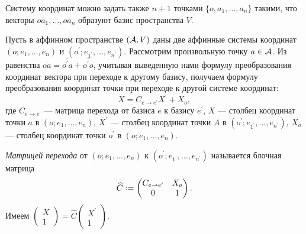 \begin{remark}
    Систему координат можно задать также $n + 1$ точками $\{o, a_1, \ldots, a_n\}$ такими, что векторы $\overline{oa_1}, \ldots, \overline{oa_n}$ образуют базис пространства $V$.
\end{remark}

Пусть в аффинном пространстве $(\mathcal{A}, V)$ даны две аффинные системы координат $(o; e_1, \ldots, e_n)$ и $(o^\prime; e_{1^\prime}, \ldots, e_{n^\prime})$. Рассмотрим произвольную точку $a \in \mathcal{A}$. Из равенства $\overline{oa} = \overline{o^\prime a} + \overline{o^\prime o}$, учитывая выведенную нами формулу преобразования координат вектора при переходе к другому базису, получаем формулу преобразования координат точки при переходе к другой системе координат:
\[
    X = C_{e \to e^\prime}X^\prime + X_o,
\]
где $C_{e \to e^\prime}$ --- матрица перехода от базиса $e$ к базису $e^\prime$, $X$ --- столбец координат точки $a$ в $(o; e_1, \ldots, e_n)$, $X^\prime$ --- столбец координат точки $A$ в $(o^\prime; e_{1^\prime}, \ldots, e_{n^\prime})$, $X_o$ --- столбец координат точки $o^\prime$ в $(o; e_1, \ldots, e_n)$.

\begin{definition}
    \textit{Матрицей перехода} от $(o; e_1, \ldots, e_n)$ к $(o^\prime; e_{1^\prime}, \ldots, e_{n^\prime})$ называется блочная матрица
    \[
        \widehat{C} \vcentcolon =
        \begin{pmatrix}
            C_{e \to e^\prime} & X_o\\
            0 & 1
        \end{pmatrix}.
    \]
    Имеем
    $
    \begin{pmatrix}
        X\\
        1
    \end{pmatrix} = \widehat{C}
    \begin{pmatrix}
        X^\prime\\
        1
    \end{pmatrix}
    $.
\end{definition}

